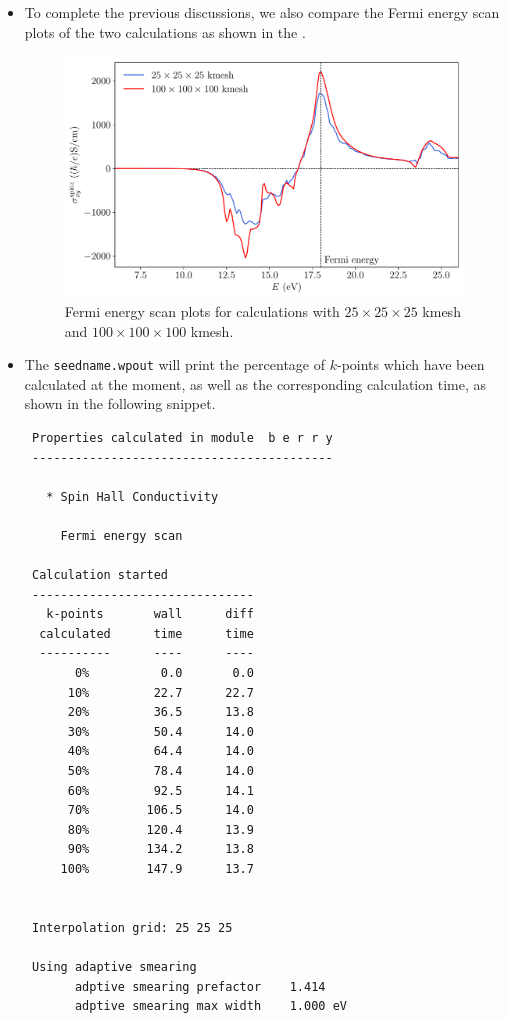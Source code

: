 \begin{itemize}
\item To complete the previous discussions, we also 
compare the Fermi energy scan plots of the two calculations as 
shown in the . 
\begin{figure}[!htb]
\centering
\includegraphics[width=.8\columnwidth]{figure/example29/pt_shc_kmesh.pdf}
\caption{Fermi energy scan plots for calculations 
	with $25\times25\times25$ kmesh and $100\times100\times100$ kmesh.}
\label{fig29.3}
\end{figure}

\item The {\tt seedname.wpout} will print the percentage of $k$-points which 
have been calculated at the moment, as well as the corresponding calculation time, as 
shown in the following snippet. 

\begin{tcolorbox}[title=Pt.wpout,sharp corners,boxrule=0.5pt]
{\small
\begin{verbatim}
 Properties calculated in module  b e r r y
 ------------------------------------------

   * Spin Hall Conductivity

     Fermi energy scan
 
 Calculation started
 -------------------------------
   k-points       wall      diff
  calculated      time      time
  ----------      ----      ----
       0%          0.0       0.0
      10%         22.7      22.7
      20%         36.5      13.8
      30%         50.4      14.0
      40%         64.4      14.0
      50%         78.4      14.0
      60%         92.5      14.1
      70%        106.5      14.0
      80%        120.4      13.9
      90%        134.2      13.8
     100%        147.9      13.7


 Interpolation grid: 25 25 25

 Using adaptive smearing
       adptive smearing prefactor    1.414
       adptive smearing max width    1.000 eV
       

\end{verbatim}}
\end{tcolorbox}
\end{itemize}

